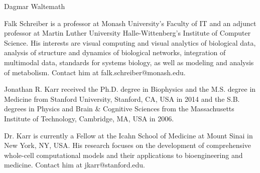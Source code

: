 \documentclass[journal,transmag]{IEEEtran}
\begin{document}
\begin{IEEEbiography}{Dagmar Waltemath}
\end{IEEEbiography}

\begin{IEEEbiography}{Falk Schreiber}
 is a professor at Monash University's Faculty of IT and an adjunct professor at Martin Luther University Halle-Wittenberg's Institute of Computer Science. His interests are visual computing and visual analytics of biological data, analysis of structure and dynamics of biological networks, integration of multimodal data, standards for systems biology, as well as modeling and analysis of metabolism.
Contact him at falk.schreiber@monash.edu.
\end{IEEEbiography}

\begin{IEEEbiography}{Jonathan R. Karr}
received the Ph.D. degree in Biophysics and the M.S. degree in Medicine from Stanford University, Stanford, CA, USA in 2014 and the S.B. degrees in Physics and Brain \& Cognitive Sciences from the Massachusetts Institute of Technology, Cambridge, MA, USA in 2006. 

Dr. Karr is currently a Fellow at the Icahn School of Medicine at Mount Sinai in New York, NY, USA. His research focuses on the development of comprehensive whole-cell computational models and their applications to bioengineering and medicine. Contact him at jkarr@stanford.edu.
\end{IEEEbiography}
\end{document}
